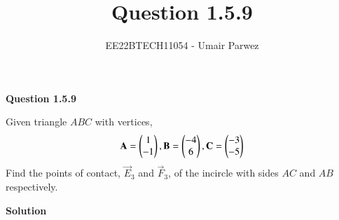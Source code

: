 \documentclass[journal,12pt,twocolumn]{IEEEtran}
\theoremstyle{remark}
\begin{document}



\vspace{3cm}

\title{
	Question 1.5.9
}

\author{
	EE22BTECH11054 - Umair Parwez
}	

\maketitle
\newpage


\renewcommand{\thefigure}{\theenumi}
\renewcommand{\thetable}{\theenumi}


\textbf{Question 1.5.9}

Given triangle $ABC$ with vertices, 
\begin{align}
	\mathbf{A} = \begin{pmatrix}1\\ -1\end{pmatrix}, \mathbf{B} = \begin{pmatrix}-4\\ 6\end{pmatrix}, \mathbf{C} = \begin{pmatrix}-3\\ -5\end{pmatrix}
\end{align}
Find the points of contact, $\vec{E}_3$ and $\vec{F}_3$, of the incircle with sides $AC$ and $AB$ respectively.

\textbf{Solution}
\end{document}
